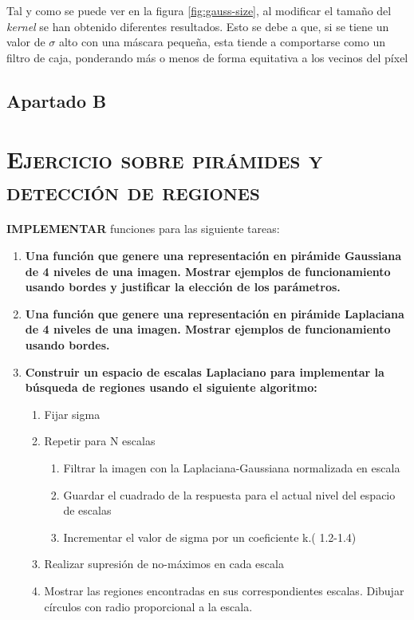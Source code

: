 \documentclass[11pt,a4paper]{article}
\begin{document}
Tal y como se puede ver en la figura \ref{fig:gauss-size}, al modificar el tamaño del \textit{kernel} se han obtenido
diferentes resultados. Esto se debe a que, si se tiene un valor de $\sigma$ alto con una máscara pequeña, esta tiende
a comportarse como un filtro de caja, ponderando más o menos de forma equitativa a los vecinos del píxel


\subsection{Apartado B}

\newpage

\section{\textsc{Ejercicio sobre pirámides y detección de regiones}}

\noindent \textbf{IMPLEMENTAR} funciones para las siguiente tareas:

\begin{enumerate}[label=\textbf{\Alph*)}]
	\item \textbf{Una función que genere una representación en pirámide Gaussiana de 4 niveles de una
	imagen. Mostrar ejemplos de funcionamiento usando bordes y justificar la elección de los parámetros.}
	\item \textbf{Una función que genere una representación en pirámide Laplaciana de 4 niveles de una imagen.
	Mostrar ejemplos de funcionamiento usando bordes.}
	\item \textbf{Construir un espacio de escalas Laplaciano para implementar la búsqueda de regiones usando el siguiente
	algoritmo:}
	\begin{enumerate}[label=\textbf{\alph*.}]
		\item Fijar sigma
		\item Repetir para N escalas
		\begin{enumerate}[label=\roman*.]
			\item Filtrar la imagen con la Laplaciana-Gaussiana normalizada en escala
			\item Guardar el cuadrado de la respuesta para el actual nivel del espacio de escalas
			\item Incrementar el valor de sigma por un coeficiente k.( 1.2-1.4)
		\end{enumerate}
		\item Realizar supresión de no-máximos en cada escala
		\item Mostrar las regiones encontradas en sus correspondientes escalas. Dibujar círculos con radio proporcional a
		la escala.
	\end{enumerate}
\end{enumerate}
\end{document}
